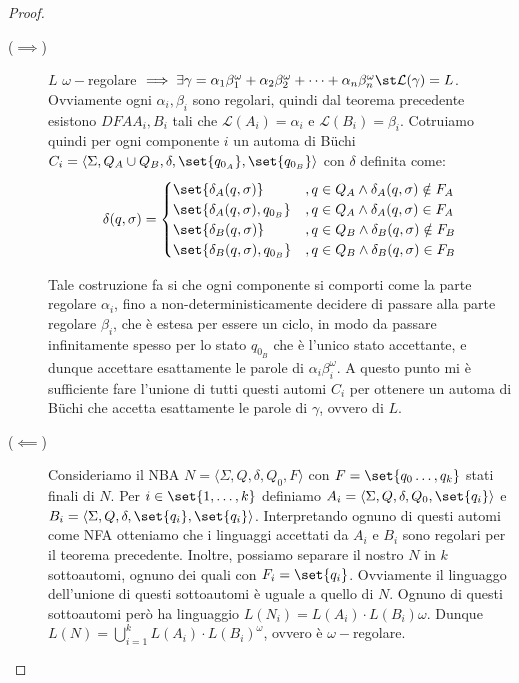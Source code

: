 \begin{proof}
  \begin{description}
    \item[(\(\implies\))] \(L\) \(\omega-\)regolare \(\implies \exists \gamma = \alpha_1\beta_1^\omega+\alpha_2\beta_2^\omega+\cdots + \alpha_n\beta_n^\omega \st \mathcal{L}(\gamma) = L\). Ovviamente ogni \(\alpha_i,\beta_i\) sono regolari, quindi dal teorema precedente esistono \(DFA A_{i}, B_{i}\) tali che \(\mathcal{L}(A_i) = \alpha_i\) e \(\mathcal{L}(B_i) = \beta_i\).
      Cotruiamo quindi per ogni componente \(i\) un automa di Büchi \(C_i= \langle \Sigma, Q_A \cup Q_B, \delta, \set{q_{0_A}}, \set{q_{0_B}}\rangle\) con \(\delta\) definita come:
      \[\delta(q,\sigma)=\begin{cases}
          \set{\delta_A(q,\sigma)}          & ,q \in Q_A \land \delta_A(q,\sigma)\notin F_A \\
          \set{\delta_A(q,\sigma), q_{0_B}} & ,q \in Q_A \land \delta_A(q,\sigma)\in F_A    \\
          \set{\delta_B(q,\sigma)}          & ,q \in Q_B \land \delta_B(q,\sigma)\notin F_B \\
          \set{\delta_B(q,\sigma), q_{0_B}} & ,q \in Q_B \land \delta_B(q,\sigma)\in F_B    \\
        \end{cases}\]

      Tale costruzione fa si che ogni componente si comporti come la parte regolare \(\alpha_i\), fino a non-deterministicamente decidere di passare alla parte regolare \(\beta_i\), che è estesa per essere un ciclo, in modo da passare infinitamente spesso per lo stato \(q_{0_B}\) che è l'unico stato accettante, e dunque accettare esattamente le parole di \(\alpha_i\beta_i^\omega\). A questo punto mi è sufficiente fare l'unione di tutti questi automi \(C_i\) per ottenere un automa di Büchi che accetta esattamente le parole di \(\gamma\), ovvero di \(L\).
    \item[(\(\impliedby\))] Consideriamo il NBA \(N = \langle \Sigma, Q, \delta, Q_0, F\rangle\) con \(F = \set{q_0\ldots,q_k}\) stati finali di \(N\). Per \(i \in \set{1,\ldots,k}\) definiamo \(A_i = \langle \Sigma, Q, \delta, Q_0, \set{q_i}\rangle\) e \(B_i = \langle \Sigma, Q, \delta, \set{q_i}, \set{q_i}\rangle\). Interpretando ognuno di questi automi come NFA otteniamo che i linguaggi accettati da \(A_i\) e \(B_i\) sono regolari per il teorema precedente. Inoltre, possiamo separare il nostro \(N\) in \(k\) sottoautomi, ognuno dei quali con \(F_i = \set{q_i}\). Ovviamente il linguaggo dell'unione di questi sottoautomi è uguale a quello di \(N\). Ognuno di questi sottoautomi però ha linguaggio \(L(N_i) = L(A_i)\cdot L(B_i)\omega\). Dunque \(L(N) = \bigcup_{i=1}^k L(A_i)\cdot {L(B_i)}^\omega\), ovvero è \(\omega-\)regolare.
  \end{description}
\end{proof}

